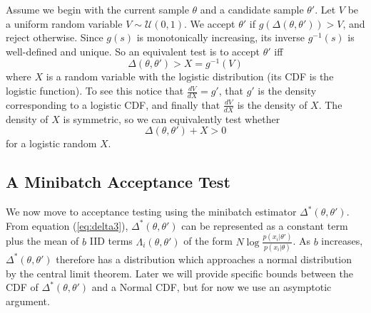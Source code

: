 \documentclass{article}
\begin{document}
Assume we begin with the current sample $\theta$  and a
candidate sample $\theta'$. Let $V$ be a uniform random variable $V \sim
\mathcal{U}(0,1)$. We accept $\theta'$ if $g(\Delta(\theta,\theta')) > V$, and reject otherwise.
Since $g(s)$ is monotonically increasing, its inverse $g^{-1}(s)$ is well-defined and
unique. So an equivalent test is to accept $\theta'$ iff
\begin{equation}
  \Delta(\theta,\theta') > X = g^{-1}(V)
\end{equation}
where $X$ is a random variable with the logistic distribution (its CDF is the logistic function). To
see this notice that $\frac{dV}{dX} = g'$, that $g'$ is the density corresponding to a logistic
CDF, and finally that $\frac{dV}{dX}$ is the density of $X$. The density of $X$ is symmetric,
so we can equivalently test whether
\begin{equation}
  \label{theexacttest}
  \Delta(\theta,\theta') + X > 0
\end{equation}
for a logistic random $X$. 


\subsection{A Minibatch Acceptance Test}\label{ssec:deltas_minibatch}

We now move to acceptance testing using the minibatch estimator
$\Delta^*(\theta,\theta')$. From equation (\ref{eq:delta3}),
$\Delta^*(\theta,\theta')$ can be represented as a constant term
plus the mean of $b$ IID terms $\Lambda_i(\theta,\theta')$ of the form
$N\log\frac{p(x_i|\theta')}{p(x_i|\theta)}$. As $b$ increases, $\Delta^*(\theta,\theta')$
therefore has a distribution which approaches a normal distribution by the central limit
theorem. Later we will provide specific bounds between the CDF of $\Delta^*(\theta,\theta')$
and a Normal CDF, but for now we use an asymptotic argument. 
\end{document}

